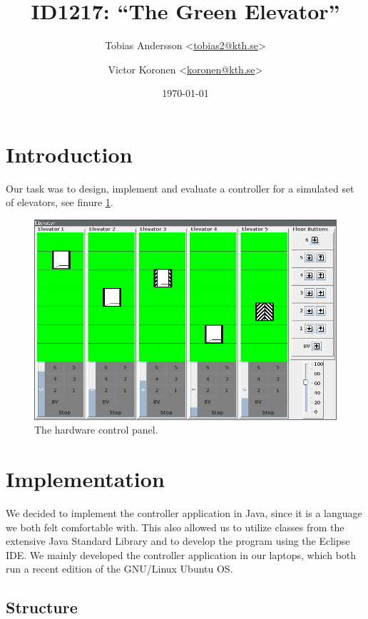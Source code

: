 \documentclass[a4paper]{article}
\title{ID1217: ``The Green Elevator''}
\author{%
    Tobias Andersson <\href{mailto:tobias2@kth.se}{tobias2@kth.se}> \and
    Victor Koronen <\href{mailto:koronen@kth.se}{koronen@kth.se}>
}
\date{\today}
\begin{document}
\maketitle
\thispagestyle{empty}

\section{Introduction}

Our task was to design, implement and evaluate a controller for a simulated set
of elevators, see finure \ref{fig:hardware_control_panel}.

\begin{figure}[p]
    \centering
    \includegraphics[width=1.0\textwidth]{images/elevators_5_6.png}
    \caption{The hardware control panel.}
    \label{fig:hardware_control_panel}
\end{figure}

\section{Implementation}

We decided to implement the controller application in Java, since it is a
language we both felt comfortable with. This also allowed us to utilize classes
from the extensive Java Standard Library and to develop the program using the
Eclipse IDE. We mainly developed the controller application in our laptops,
which both run a recent edition of the GNU/Linux Ubuntu OS.

\subsection{Structure}
\end{document}
